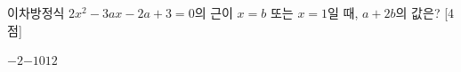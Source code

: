 이차방정식 $2x^2-3ax-2a+3=0$의 근이 $x=b$ 또는 $x=1$일 때, $a+2b$의 값은?  \mbox{[4점]}
\begin{choices32}{$-2$}{$-1$}{$0$}{$1$}{$2$}\end{choices32}
